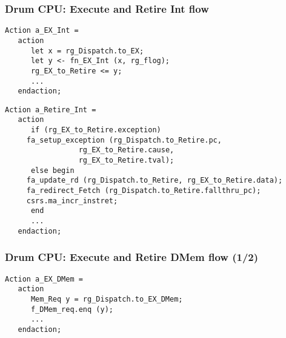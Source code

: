 
\begin{frame}[fragile]
\frametitle{Drum CPU: Execute and Retire Int flow}

\footnotesize

\begin{minipage}{0.725\textwidth}
\begin{Verbatim}[frame=single, label=From src\_Drum/CPU.bsv]
   Action a_EX_Int =
   action
      let x = rg_Dispatch.to_EX;
      let y <- fn_EX_Int (x, rg_flog);
      rg_EX_to_Retire <= y;
      ...
   endaction;
\end{Verbatim}
\end{minipage}

\begin{minipage}{0.725\textwidth}
\begin{Verbatim}[frame=single]
   Action a_Retire_Int =
   action
      if (rg_EX_to_Retire.exception)
	 fa_setup_exception (rg_Dispatch.to_Retire.pc,
			     rg_EX_to_Retire.cause,
			     rg_EX_to_Retire.tval);
      else begin
	 fa_update_rd (rg_Dispatch.to_Retire, rg_EX_to_Retire.data);
	 fa_redirect_Fetch (rg_Dispatch.to_Retire.fallthru_pc);
	 csrs.ma_incr_instret;
      end
      ...
   endaction;
\end{Verbatim}
\end{minipage}

\end{frame}


\begin{frame}[fragile]
\frametitle{Drum CPU: Execute and Retire DMem flow (1/2)}

\footnotesize

\begin{minipage}{0.725\textwidth}
\begin{Verbatim}[frame=single, label=From src\_Drum/CPU.bsv]
   Action a_EX_DMem =
   action
      Mem_Req y = rg_Dispatch.to_EX_DMem;
      f_DMem_req.enq (y);
      ...
   endaction;
\end{Verbatim}
\end{minipage}

\end{frame}


